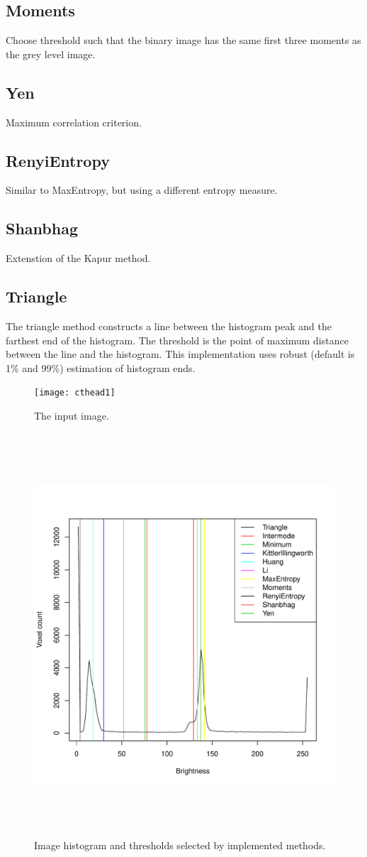 \documentclass{InsightArticle}
\begin{document}
\subsection{Moments}
Choose threshold such that the binary image has the same first three moments as the grey level image.
\subsection{Yen}
Maximum correlation criterion.
\subsection{RenyiEntropy}
Similar to MaxEntropy, but using a different entropy measure.
\subsection{Shanbhag}
Extenstion of the Kapur method.

\subsection{Triangle}
The triangle method constructs a line between the histogram peak and
the farthest end of the histogram. The threshold is the point of
maximum distance between the line and the histogram. This
implementation uses robust (default is 1\% and 99\%) estimation of histogram ends.

\begin{figure}[htbp]
\centering
\texttt{[image: cthead1]}
\caption{The input image.\label{fig:cthead}}
\end{figure}

\begin{figure}[htbp]
\centering
\includegraphics[height=15cm]{hist_results}
\caption{Image histogram and thresholds selected by implemented methods.\label{fig:thresh}}
\end{figure}
\end{document}
